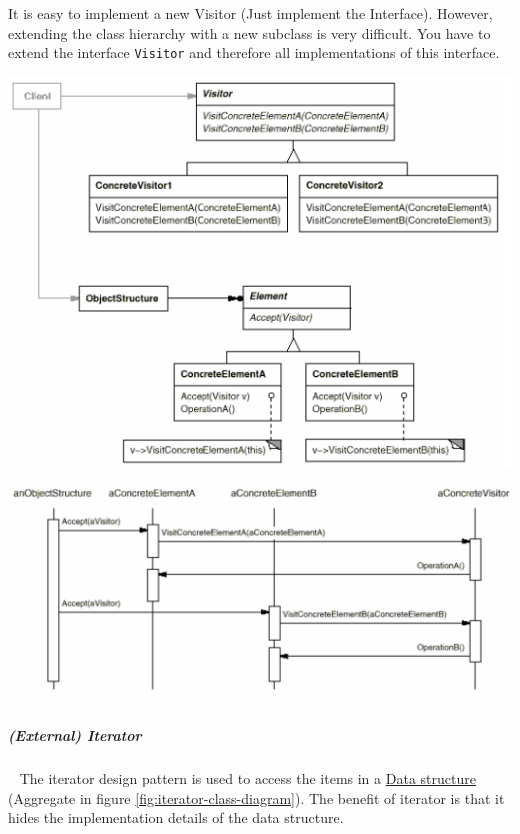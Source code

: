 \documentclass[11pt,twoside,landscape]{article}
\begin{document}
\begin{multicols}{3}
It is easy to implement a new Visitor (Just implement the Interface).
However, extending the class hierarchy with a new subclass is very difficult.
You have to extend the interface \texttt{Visitor} and therefore all implementations of this interface.

{
\begin{center}
\includegraphics[width=.9\linewidth]{img/visitor.png}
\end{center}
\label{fig:visitor-class-diagram}
}

{
\begin{center}
\includegraphics[width=.9\linewidth]{img/visitor_sequence.png}
\end{center}
\label{fig:visitor-sequence}
}

\subparagraph{(External) Iterator} \
\label{sec:org2073614}
The iterator design pattern is used to access the items in a \href{../../../roam/20210518131131-datastructure.org}{Data structure} (Aggregate in figure \ref{fig:iterator-class-diagram}).
The benefit of iterator is that it hides the implementation details of the data structure.


\end{multicols}
\end{document}
